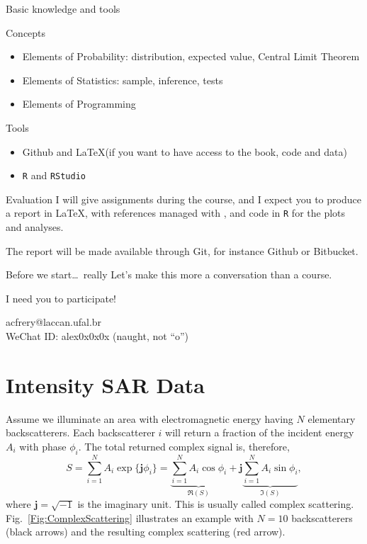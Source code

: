 \documentclass{beamer}
\begin{document}
\begin{frame}{Basic knowledge and tools}

\begin{alertblock}{Concepts}
\begin{itemize}
\item Elements of Probability: distribution, expected value, Central Limit Theorem
\item Elements of Statistics: sample, inference, tests
\item Elements of Programming
\end{itemize}
\end{alertblock}

\begin{alertblock}{Tools}
\begin{itemize}
\item Github and \LaTeX (if you want to have access to the book, code and data)
\item \texttt R and \texttt{RStudio}
\end{itemize}
\end{alertblock}
\end{frame}

\begin{frame}{Evaluation}
I will give assignments during the course, and I expect you to produce a report in \LaTeX, with references managed with \BibTeX, and code in \texttt R for the plots and analyses.

The report will be made available through Git, for instance Github or Bitbucket.
\end{frame}

\begin{frame}{Before we start\dots\ really}
Let's make this more a conversation than a course.

I need you to participate!

acfrery@laccan.ufal.br\\
WeChat ID: alex0x0x0x (naught, not ``o'')
\end{frame}


\section{Intensity SAR Data}

\begin{frame}
Assume we illuminate an area with electromagnetic energy having $N$ elementary backscatterers.
Each backscatterer $i$ will return a fraction of the incident energy $A_i$ with phase $\phi_i$.
The total returned complex signal is, therefore,
\begin{equation}
S = \sum_{i=1}^{N} A_i \exp\{\mathbf j \phi_i\} = 
\underbrace{{\sum_{i=1}^{N} A_i \cos \phi_i}}_{\Re(S)} +\mathbf j \underbrace{ \sum_{i=1}^{N} A_i \sin \phi_i}_{\Im(S)}, 
\label{Eq:ComplexBackscatter}
\end{equation}
where $\mathbf j=\sqrt{-1}$ is the imaginary unit.
This is usually called complex scattering.
Fig.~\ref{Fig:ComplexScattering} illustrates an example with $N=10$ backscatterers (black arrows) and the resulting complex scattering (red arrow).
\end{frame}
\end{document}

